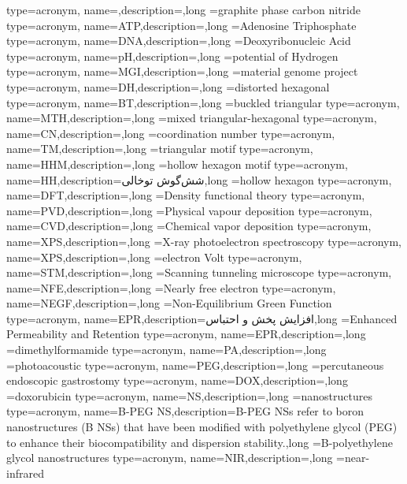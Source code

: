 {type=acronym, name={},description={},long ={graphite phase carbon nitride}
}
{type=acronym, name={ATP},description={},long ={Adenosine Triphosphate}
}
{type=acronym, name={DNA},description={},long ={Deoxyribonucleic Acid}
}
{type=acronym, name={pH},description={},long ={potential of Hydrogen}
}
{type=acronym, name={MGI},description={},long ={material genome project}
}
{type=acronym, name={DH},description={},long ={distorted hexagonal}
}
{type=acronym, name={BT},description={},long ={buckled triangular}
}
{type=acronym, name={MTH},description={},long ={mixed triangular-hexagonal}
}
{type=acronym, name={CN},description={},long ={coordination number}
}
{type=acronym, name={TM},description={},long ={triangular motif}
}
{type=acronym, name={HHM},description={},long ={hollow hexagon motif}
}
{type=acronym, name={HH},description={شش‌گوش توخالی},long ={hollow hexagon}
}
{type=acronym, name={DFT},description={},long ={Density functional theory}
}
{type=acronym, name={PVD},description={},long ={Physical vapour deposition}
}
{type=acronym, name={CVD},description={},long ={Chemical vapor deposition}
}
{type=acronym, name={XPS},description={},long ={X-ray photoelectron spectroscopy}
}
{type=acronym, name={XPS},description={},long ={electron Volt}
}
{type=acronym, name={STM},description={},long ={Scanning tunneling microscope}
}
{type=acronym, name={NFE},description={},long ={Nearly free electron}
}
{type=acronym, name={NEGF},description={},long ={Non-Equilibrium Green Function}
}
{type=acronym, name={EPR},description={افزایش پخش و احتباس},long ={Enhanced Permeability and Retention}
}
{type=acronym, name={EPR},description={},long ={dimethylformamide}
}
{type=acronym, name={PA},description={},long ={photoacoustic}
}
{type=acronym, name={PEG},description={},long ={percutaneous endoscopic gastrostomy}
}
{type=acronym, name={DOX},description={},long ={doxorubicin}
}
{type=acronym, name={NS},description={},long ={nanostructures}
}
{type=acronym, name={B-PEG NS},description={B-PEG NSs refer to boron nanostructures (B NSs) that have been modified with polyethylene glycol (PEG) to enhance their biocompatibility and dispersion stability.},long ={B-polyethylene glycol nanostructures }
}
{type=acronym, name={NIR},description={},long ={near-infrared}
}
